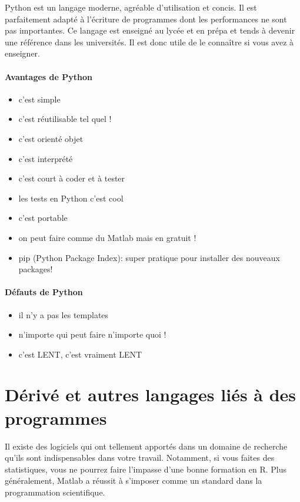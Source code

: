 Python est un langage moderne, agréable d'utilisation et concis.
Il est parfaitement adapté à l'écriture de programmes dont les performances ne sont
pas importantes. Ce langage est enseigné au lycée et en prépa et tends à devenir une référence
dans les universités. Il est donc utile de le connaître si vous avez à enseigner.


\paragraph{Avantages de Python}
\begin{itemize}
\item c'est simple
\item c'est réutilisable tel quel ! 
\item c'est orienté objet
\item c'est interprété
\item c'est court à coder et à  tester
\item les tests en Python c'est cool %
\item c'est portable
\item on peut faire comme du Matlab mais en gratuit ! %
\item pip (Python Package Index): super pratique pour installer des nouveaux packages!
\end{itemize}

\paragraph{Défauts de Python}
\begin{itemize}
\item il n'y a pas les templates
\item n'importe qui peut faire n'importe quoi ! %
\item c'est LENT, c'est vraiment LENT
\end{itemize}

\section{Dérivé et autres langages liés à des programmes}

Il existe des logiciels qui ont tellement apportés dans un domaine de recherche qu'ils sont 
indispensables dans votre travail. Notamment, si vous faites des statistiques, vous ne pourrez
 faire l'impasse d'une bonne formation en R. Plus généralement, Matlab a réussit à s'imposer 
comme un standard dans la programmation scientifique.\\


